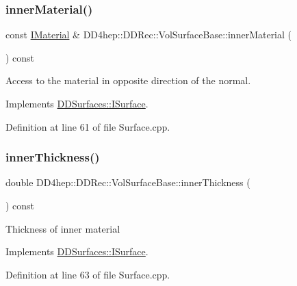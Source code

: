 \subsubsection{\texorpdfstring{inner\+Material()}{innerMaterial()}}
{\footnotesize\ttfamily const \hyperlink{class_d_d_surfaces_1_1_i_material}{I\+Material} \& D\+D4hep\+::\+D\+D\+Rec\+::\+Vol\+Surface\+Base\+::inner\+Material (\begin{DoxyParamCaption}{ }\end{DoxyParamCaption}) const\hspace{0.3cm}{\ttfamily [virtual]}}



Access to the material in opposite direction of the normal. 



Implements \hyperlink{class_d_d_surfaces_1_1_i_surface_a18942d2f0ea7478506765a50fa44d5e3}{D\+D\+Surfaces\+::\+I\+Surface}.



Definition at line 61 of file Surface.\+cpp.

\hypertarget{class_d_d4hep_1_1_d_d_rec_1_1_vol_surface_base_af4f950cb7ebf4cef9d35bb5e59d81e8a}{}\label{class_d_d4hep_1_1_d_d_rec_1_1_vol_surface_base_af4f950cb7ebf4cef9d35bb5e59d81e8a} 
\subsubsection{\texorpdfstring{inner\+Thickness()}{innerThickness()}}
{\footnotesize\ttfamily double D\+D4hep\+::\+D\+D\+Rec\+::\+Vol\+Surface\+Base\+::inner\+Thickness (\begin{DoxyParamCaption}{ }\end{DoxyParamCaption}) const\hspace{0.3cm}{\ttfamily [virtual]}}

Thickness of inner material 

Implements \hyperlink{class_d_d_surfaces_1_1_i_surface_ab6913582dd6c1f44df2038705ce2aea6}{D\+D\+Surfaces\+::\+I\+Surface}.



Definition at line 63 of file Surface.\+cpp.

\hypertarget{class_d_d4hep_1_1_d_d_rec_1_1_vol_surface_base_a19dfde80d6e3d0dbe07dc3547dc20925}{}\label{class_d_d4hep_1_1_d_d_rec_1_1_vol_surface_base_a19dfde80d6e3d0dbe07dc3547dc20925} 
